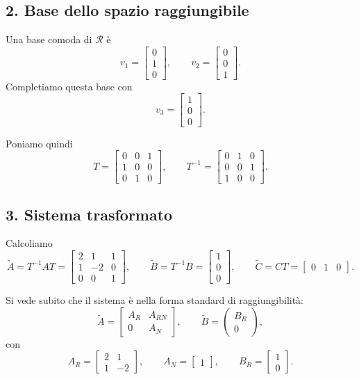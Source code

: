 \subsection*{2. Base dello spazio raggiungibile}

Una base comoda di \(\mathcal{R}\) è
\[
v_1=
\begin{bmatrix}
0\\
1\\
0
\end{bmatrix},
\qquad
v_2=
\begin{bmatrix}
0\\
0\\
1
\end{bmatrix}.
\]
Completiamo questa base con
\[
v_3=
\begin{bmatrix}
1\\
0\\
0
\end{bmatrix}.
\]

Poniamo quindi
\[
T=
\begin{bmatrix}
0 & 0 & 1\\
1 & 0 & 0\\
0 & 1 & 0
\end{bmatrix},
\qquad
T^{-1}=
\begin{bmatrix}
0 & 1 & 0\\
0 & 0 & 1\\
1 & 0 & 0
\end{bmatrix}.
\]

\subsection*{3. Sistema trasformato}

Calcoliamo
\[
\tilde A=T^{-1}AT=
\begin{bmatrix}
2 & 1 & 1\\
1 & -2 & 0\\
0 & 0 & 1
\end{bmatrix},
\qquad
\tilde B=T^{-1}B=
\begin{bmatrix}
1\\
0\\
0
\end{bmatrix},
\qquad
\tilde C=CT=
\begin{bmatrix}
0 & 1 & 0
\end{bmatrix}.
\]

Si vede subito che il sistema è nella forma standard di raggiungibilità:
\[
\tilde A=
\begin{bmatrix}
A_R & A_{RN}\\
0 & A_N
\end{bmatrix},
\qquad
\tilde B=
\begin{pmatrix}
B_R\\
0
\end{pmatrix},
\]
con
\[
A_R=
\begin{bmatrix}
2 & 1\\
1 & -2
\end{bmatrix},
\qquad
A_N=
\begin{bmatrix}
1
\end{bmatrix},
\qquad
B_R=
\begin{bmatrix}
1\\
0
\end{bmatrix}.
\]

